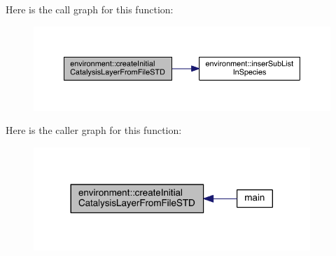 Here is the call graph for this function\+:\nopagebreak
\begin{figure}[H]
\begin{center}
\leavevmode
\includegraphics[width=350pt]{a00013_a29eeb7a1b4689c10fd872e82179b4d84_cgraph}
\end{center}
\end{figure}




Here is the caller graph for this function\+:\nopagebreak
\begin{figure}[H]
\begin{center}
\leavevmode
\includegraphics[width=296pt]{a00013_a29eeb7a1b4689c10fd872e82179b4d84_icgraph}
\end{center}
\end{figure}


